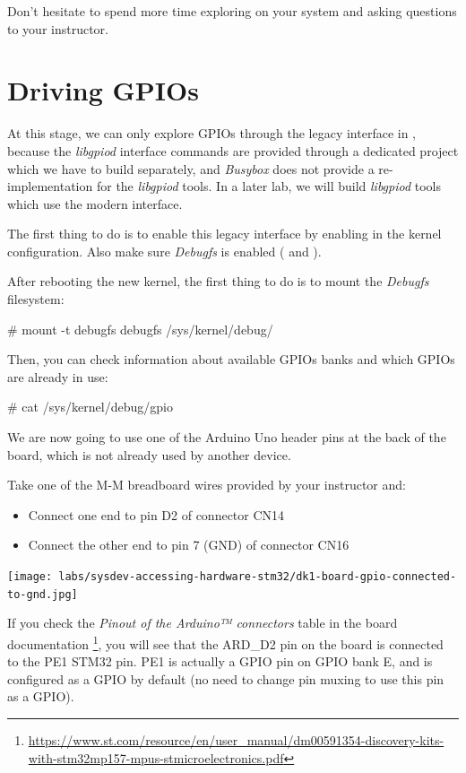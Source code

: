 Don't hesitate to spend more time exploring  on your system
and asking questions to your instructor.

\section{Driving GPIOs}

At this stage, we can only explore GPIOs through the legacy interface
in , because the {\em libgpiod} interface
commands are provided through a dedicated project which we have to
build separately, and {\em Busybox} does not provide a
re-implementation for the {\em libgpiod} tools. In a later lab, we
will build {\em libgpiod} tools which use the modern
 interface.

The first thing to do is to enable this legacy interface by enabling
 in the kernel configuration. Also make sure
{\em Debugfs} is enabled ( and
).

After rebooting the new kernel, the first thing to do is to mount
the {\em Debugfs} filesystem:

\begin{bashinput}
# mount -t debugfs debugfs /sys/kernel/debug/
\end{bashinput}

Then, you can check information about available GPIOs banks and which
GPIOs are already in use:

\begin{bashinput}
# cat /sys/kernel/debug/gpio
\end{bashinput}

\if{}
We are now going to use one of the Arduino Uno header pins at the back
of the board, which is not already used by another device.

Take one of the M-M breadboard wires provided by your instructor and:
\begin{itemize}
  \item Connect one end to pin D2 of connector CN14
  \item Connect the other end to pin 7 (GND) of connector CN16
\end{itemize}

\texttt{[image: labs/sysdev-accessing-hardware-stm32/dk1-board-gpio-connected-to-gnd.jpg]}

If you check the {\em Pinout of the Arduino™ connectors} table in the board
documentation
\footnote{\url{https://www.st.com/resource/en/user_manual/dm00591354-discovery-kits-with-stm32mp157-mpus-stmicroelectronics.pdf}},
you will see that the ARD\_D2 pin on the board is connected to the PE1
STM32 pin. PE1 is actually a GPIO pin on GPIO bank E, and is configured
as a GPIO by default (no need to change pin muxing to use this pin as
a GPIO).

